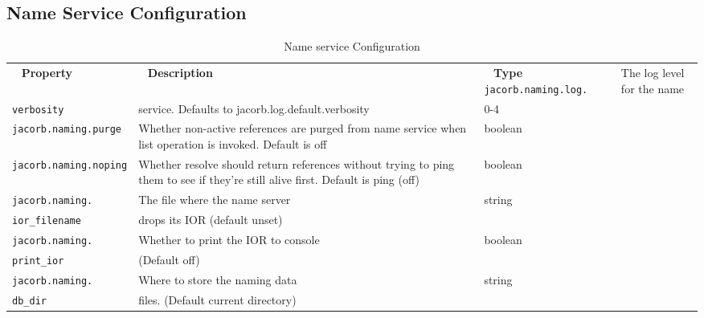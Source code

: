 \subsection{Name Service Configuration}
\begin{small}
\begin{longtable}{|p{5cm}|p{9cm}|p{2cm}|}
\caption{Name service Configuration}\\
\hline
~ \hfill \textbf {Property} \hfill ~ & ~ \hfill \textbf {Description} \hfill ~ & ~ \hfill \textbf {Type} \hfill ~ \endhead
\hline
\verb"jacorb.naming.log." & The log level for the name & \\
\verb"verbosity" & service. Defaults to jacorb.log.default.verbosity & 0-4  \\
\hline
\verb"jacorb.naming.purge" & Whether non-active references are purged from name service
when list operation is invoked. Default is off & boolean\\
\hline
\verb"jacorb.naming.noping" & Whether resolve should return references without trying to
ping them to see if they're still alive first. Default is ping (off) & boolean\\
\hline
\verb"jacorb.naming." & The file where the name server & string\\
\verb"ior_filename" &  drops its IOR (default unset) &   \\
\hline
\verb"jacorb.naming." & Whether to print the IOR to console & boolean\\
\verb"print_ior" & (Default off) &\\
\hline
\verb"jacorb.naming." & Where to store the naming data & string\\
\verb"db_dir" & files. (Default current directory) & \\
\hline
\end{longtable}
\end{small}



